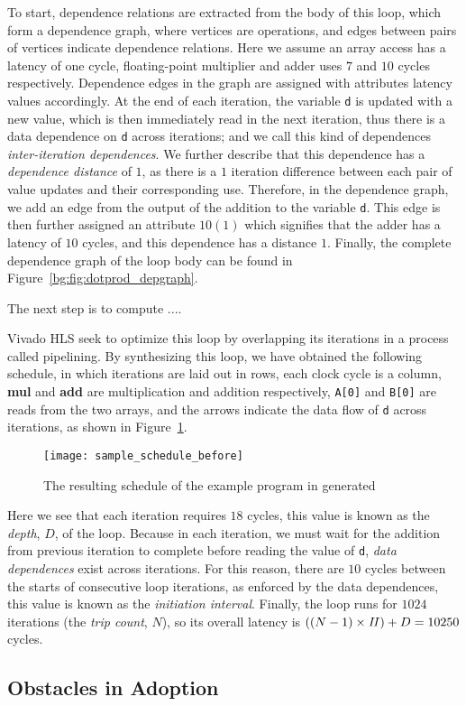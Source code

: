 To start, dependence relations are extracted from the body of this loop, which
form a dependence graph, where vertices are operations, and edges between
pairs of vertices indicate dependence relations.  Here we assume an array
access has a latency of one cycle, floating-point multiplier and adder uses
$7$ and $10$ cycles respectively.  Dependence edges in the graph are assigned
with attributes latency values accordingly.  At the end of each iteration,
the variable \verb|d| is updated with a new value, which is then immediately
read in the next iteration, thus there is a data dependence on \verb|d|
across iterations; and we call this kind of dependences \emph{inter-iteration
dependences}.  We further describe that this dependence has a \emph{dependence
distance} of $1$, as there is a $1$ iteration difference between each pair
of value updates and their corresponding use.  Therefore, in the dependence
graph, we add an edge from the output of the addition to the variable \verb|d|.
This edge is then further assigned an attribute $10 (1)$ which signifies that
the adder has a latency of $10$ cycles, and this dependence has a distance
$1$.  Finally, the complete dependence graph of the loop body can be found in
Figure~\ref{bg:fig:dotprod_depgraph}.

The next step is to compute ....

Vivado HLS seek to optimize this loop by overlapping its iterations in a
process called pipelining.  By synthesizing this loop, we have obtained the
following schedule, in which iterations are laid out in rows, each clock cycle
is a column, \textbf{mul} and \textbf{add} are multiplication and addition
respectively, \verb|A[0]| and \verb|B[0]| are reads from the two arrays, and
the arrows indicate the data flow of \verb|d| across iterations, as shown in
Figure~\ref{bg:fig:sample_schedule_before}.
\begin{figure}[ht]
    \centering
    \texttt{[image: sample\_schedule\_before]}
    \caption{The resulting schedule of the example program in generated}
    \label{bg:fig:sample_schedule_before}
\end{figure}

Here we see that each iteration requires $18$ cycles, this value is known as
the \emph{depth}, $D$, of the loop.  Because in each iteration, we must wait
for the addition from previous iteration to complete before reading the value
of \verb|d|, \emph{data dependences} exist across iterations.  For this reason,
there are $10$ cycles between the starts of consecutive loop iterations, as
enforced by the data dependences, this value is known as the \emph{initiation
interval}.  Finally, the loop runs for $1024$ iterations (the \emph{trip
count}, $N$), so its overall latency is $((N-1)\times \mathit{II}) + D = 10250$ cycles.


\subsection{Obstacles in Adoption}
\label{sub:obstacles_in_adoption}


